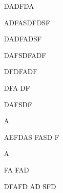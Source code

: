 DADFDA



ADFASDFDSF


DADFADSF



DAFSDFADF




DFDFADF



DFA
DF



DAFSDF

A

AEFDAS
FASD
F

A



FA
FAD

DFAFD
AD
SFD














































